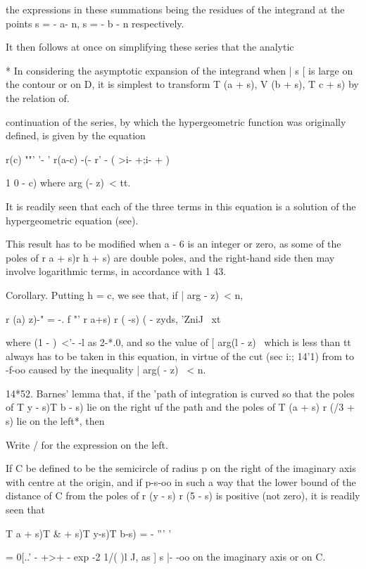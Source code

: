 the expressions in these summations being the residues of the
integrand at the points s = - a- n, s = - b - n respectively.

It then follows at once on simplifying these series that the analytic

* In considering the asymptotic expansion of the integrand when | s [
is large on the contour or on D, it is simplest to transform T (a +
s), V (b + s), T c + s) by the relation of.

%
%

continuation of the series, by which the hypergeometric function was
originally defined, is given by the equation

r(c) ""' '- ' r(a-c) -(- r' - ( >i- +;i- + )

1 0 - c) where arg (- z)\ < tt.

It is readily seen that each of the three terms in this equation is a
solution of the hypergeometric equation (see).

This result has to be modified when a - 6 is an integer or zero, as
some of the poles of r a + s)r h + s) are double poles, and the
right-hand side then may involve logarithmic terms, in accordance with
1 43.

Corollary. Putting h = c, we see that, if | arg - z)\ < n,

r (a) z)-" = -. f "' r a+s) r ( -s) ( - zyds, 'ZniJ \ xt

where (1 - )~<'- -l as 2-*.0, and so the value of [ arg(l - z) \ which
is less than tt always has to be taken in this equation, in virtue of
the cut (sec i:; 14'1) from to -f-oo caused by the inequality | arg( -
z) \ < n.

14*52. Barnes' lemma that, if the 'path of integration is curved so
that the poles of T y - s)T b - s) lie on the right uf the path and
the poles of T (a + s) r (/3 + s) lie on the left*, then

Write / for the expression on the left.

If C be defined to be the semicircle of radius p on the right of the
imaginary axis with centre at the origin, and if p-s-oo in such a way
that the lower bound of the distance of C from the poles of r (y - s)
r (5 - s) is positive (not zero), it is readily seen that

T a + s)T \& + s)T y-s)T b-s) = - ''' '

= 0[..' - +>+ - exp -2 1/( )l J, as ] s |- -oo on the imaginary axis
or on C.

